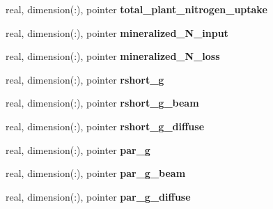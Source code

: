 \begin{DoxyCompactItemize}
\item 
\hypertarget{structed__state__vars_1_1sitetype_aa08b480d35dc0fa666fdd81a9e39b5b6}{
real, dimension(:), pointer {\bfseries total\_\-plant\_\-nitrogen\_\-uptake}}
\label{structed__state__vars_1_1sitetype_aa08b480d35dc0fa666fdd81a9e39b5b6}

\item 
\hypertarget{structed__state__vars_1_1sitetype_aadef746599fbb8fbd8519d3724d51c5e}{
real, dimension(:), pointer {\bfseries mineralized\_\-N\_\-input}}
\label{structed__state__vars_1_1sitetype_aadef746599fbb8fbd8519d3724d51c5e}

\item 
\hypertarget{structed__state__vars_1_1sitetype_a1e1a1f7db9c4c9b40ea7d477eb5d8a4e}{
real, dimension(:), pointer {\bfseries mineralized\_\-N\_\-loss}}
\label{structed__state__vars_1_1sitetype_a1e1a1f7db9c4c9b40ea7d477eb5d8a4e}

\item 
\hypertarget{structed__state__vars_1_1sitetype_ab507073ead818efd82c22c0f54b34857}{
real, dimension(:), pointer {\bfseries rshort\_\-g}}
\label{structed__state__vars_1_1sitetype_ab507073ead818efd82c22c0f54b34857}

\item 
\hypertarget{structed__state__vars_1_1sitetype_a434d9d9620bfd15d80c0e25e6cf3dbee}{
real, dimension(:), pointer {\bfseries rshort\_\-g\_\-beam}}
\label{structed__state__vars_1_1sitetype_a434d9d9620bfd15d80c0e25e6cf3dbee}

\item 
\hypertarget{structed__state__vars_1_1sitetype_a72f18521739101652d52750aeb40446f}{
real, dimension(:), pointer {\bfseries rshort\_\-g\_\-diffuse}}
\label{structed__state__vars_1_1sitetype_a72f18521739101652d52750aeb40446f}

\item 
\hypertarget{structed__state__vars_1_1sitetype_a99af96e1297f2b25080c3979354e6cb2}{
real, dimension(:), pointer {\bfseries par\_\-g}}
\label{structed__state__vars_1_1sitetype_a99af96e1297f2b25080c3979354e6cb2}

\item 
\hypertarget{structed__state__vars_1_1sitetype_a032e1e7cdb88ce2a6f52becbffe05950}{
real, dimension(:), pointer {\bfseries par\_\-g\_\-beam}}
\label{structed__state__vars_1_1sitetype_a032e1e7cdb88ce2a6f52becbffe05950}

\item 
\hypertarget{structed__state__vars_1_1sitetype_a121b447f7a27d9d1b4cf75693e8b955c}{
real, dimension(:), pointer {\bfseries par\_\-g\_\-diffuse}}
\label{structed__state__vars_1_1sitetype_a121b447f7a27d9d1b4cf75693e8b955c}


\end{DoxyCompactItemize}
